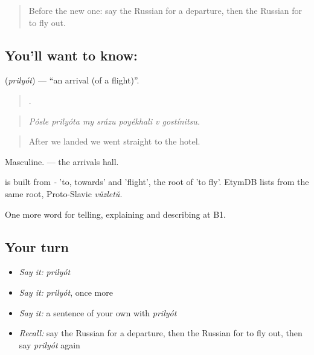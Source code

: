 \label{lesson:RU-C422-prilyot}



\begin{quote}
Before the new one: say the Russian for a departure, then the Russian for to fly out.
\end{quote}

\subsection*{You'll want to know: }
\textbf{} (\emph{prilyót}) — \textquotedblleft{}an arrival (of a flight)\textquotedblright{}.

\begin{quote}
      .
\end{quote}

\begin{quote}
\emph{Pósle prilyóta my srázu poyékhali v gostínitsu.}
\end{quote}

\begin{quote}
After we landed we went straight to the hotel.
\end{quote}

Masculine. \emph{ } — the arrivals hall.

\begin{cousinweb}
\emph{} is built from \emph{-} 'to, towards' and \emph{} 'flight', the root of \emph{} 'to fly'. EtymDB lists \emph{} from the same root, Proto-Slavic \emph{vŭzletŭ}.
\end{cousinweb}

\begin{grammarlens}[title={What you've built}]
One more word for telling, explaining and describing at B1.
\end{grammarlens}

\subsection*{Your turn}
\begin{itemize}
\raggedright
  \item \emph{Say it:} \emph{prilyót}
  \item \emph{Say it:} \emph{prilyót}, once more
  \item \emph{Say it:} a sentence of your own with \emph{prilyót}
  \item \emph{Recall:} say the Russian for a departure, then the Russian for to fly out, then say \emph{prilyót} again
\end{itemize}

